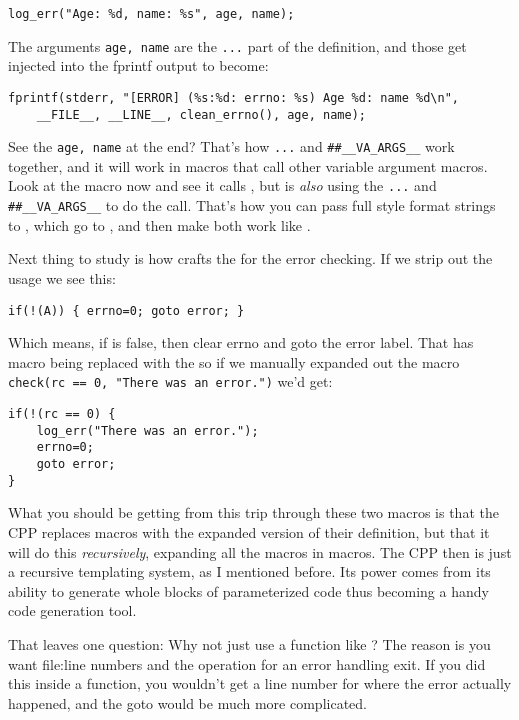 \verb|log_err("Age: %d, name: %s", age, name);|

The arguments \verb|age, name| are the \verb|...| part of the definition, and those
get injected into the fprintf output to become:

\begin{Verbatim}
fprintf(stderr, "[ERROR] (%s:%d: errno: %s) Age %d: name %d\n",
    __FILE__, __LINE__, clean_errno(), age, name);
\end{Verbatim}

See the \verb|age, name| at the end? That's how \verb|...| and
\verb|##__VA_ARGS__| work together, and it will work in macros that call other
variable argument macros.  Look at the  macro now and see it calls
, but  is \emph{also} using the \verb|...| and
\verb|##__VA_ARGS__| to do the call.  That's how you can pass full
 style format strings to , which go to
, and then make both work like .

Next thing to study is how  crafts the  for the
error checking.  If we strip out the  usage we see this:

\verb|if(!(A)) { errno=0; goto error; }|

Which means, if  is false, then clear errno and goto the error label.
That has  macro being replaced with the  so if
we manually expanded out the macro \verb|check(rc == 0, "There was an error.")|
we'd get:

\begin{Verbatim}
if(!(rc == 0) {
    log_err("There was an error.");
    errno=0;
    goto error;
}
\end{Verbatim}

What you should be getting from this trip through these two macros is that
the CPP replaces macros with the expanded version of their definition, but
that it will do this \emph{recursively}, expanding all the macros in macros.
The CPP then is just a recursive templating system, as I mentioned before.
Its power comes from its ability to generate whole blocks of parameterized
code thus becoming a handy code generation tool.

That leaves one question:  Why not just use a function like ?
The reason is you want file:line numbers and the  operation
for an error handling exit.  If you did this inside a function, you wouldn't
get a line number for where the error actually happened, and the goto would
be much more complicated.

